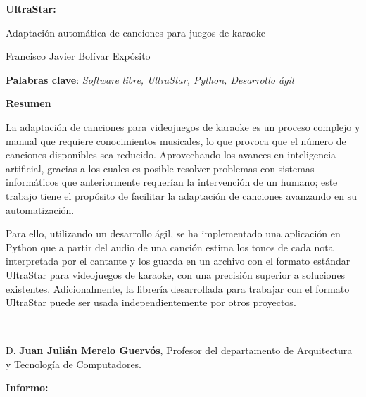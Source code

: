 \thispagestyle{empty}

\begin{center}
\large\bfseries
UltraStar: \texttt{}

Adaptación automática de canciones para juegos de karaoke
\end{center}

\begin{center}
Francisco Javier Bolívar Expósito
\end{center}


\vspace{0.5cm}
\noindent\textbf{Palabras clave}: \textit{Software libre, UltraStar, Python, Desarrollo ágil}
\vspace{0.7cm}

\noindent\textbf{Resumen}

La adaptación de canciones para videojuegos de karaoke es un proceso complejo y manual que requiere conocimientos musicales, lo que provoca que el número de canciones disponibles sea reducido. Aprovechando los avances en inteligencia artificial, gracias a los cuales es posible resolver problemas con sistemas informáticos que anteriormente requerían la intervención de un humano; este trabajo tiene el propósito de facilitar la adaptación de canciones avanzando en su automatización.

Para ello, utilizando un desarrollo ágil, se ha implementado una aplicación en Python que a partir del audio de una canción estima los tonos de cada nota interpretada por el cantante y los guarda en un archivo con el formato estándar UltraStar para videojuegos de karaoke, con una precisión superior a soluciones existentes. Adicionalmente, la librería desarrollada para trabajar con el formato UltraStar puede ser usada independientemente por otros proyectos.


\cleardoublepage



\cleardoublepage

\thispagestyle{empty}

\noindent\rule[-1ex]{\textwidth}{2pt}\\[4.5ex]

D. \textbf{Juan Julián Merelo Guervós}, Profesor del departamento de Arquitectura y Tecnología de Computadores.

\vspace{0.5cm}

\textbf{Informo:}

